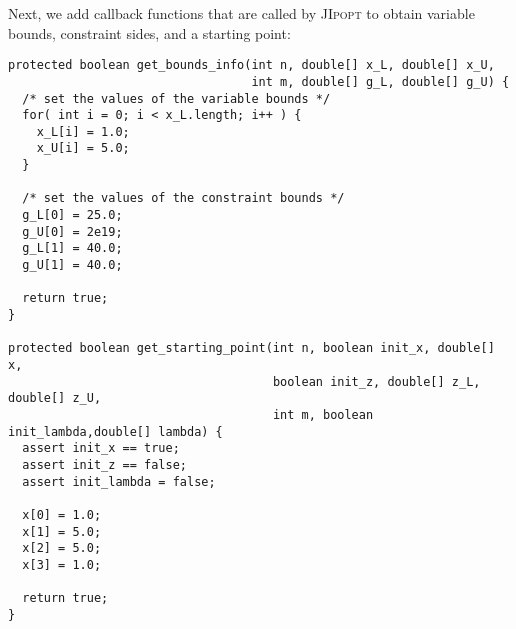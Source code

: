 \documentclass[10pt]{article}
\newcommand{\JIpopt}{\textsc{JIpopt}\xspace}
\begin{document}
\noindent Next, we add callback functions that are called by \JIpopt to obtain
variable bounds, constraint sides, and a starting point:
\begin{verbatim}
protected boolean get_bounds_info(int n, double[] x_L, double[] x_U,
                                  int m, double[] g_L, double[] g_U) {
  /* set the values of the variable bounds */
  for( int i = 0; i < x_L.length; i++ ) {
    x_L[i] = 1.0;
    x_U[i] = 5.0;
  }
  
  /* set the values of the constraint bounds */
  g_L[0] = 25.0;
  g_U[0] = 2e19;
  g_L[1] = 40.0;
  g_U[1] = 40.0;
        
  return true;
}
    
protected boolean get_starting_point(int n, boolean init_x, double[] x,
                                     boolean init_z, double[] z_L, double[] z_U,
                                     int m, boolean init_lambda,double[] lambda) {
  assert init_x == true;
  assert init_z == false;
  assert init_lambda = false;
  
  x[0] = 1.0;
  x[1] = 5.0;
  x[2] = 5.0;
  x[3] = 1.0;     
        
  return true;
}
\end{verbatim}
\end{document}
